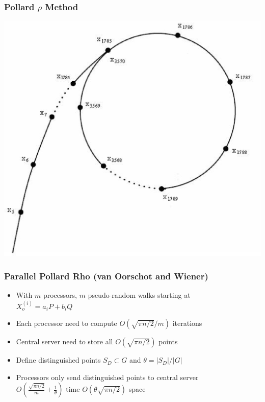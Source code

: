 \documentclass{beamer}
\begin{document}
  \begin{frame}
  	\frametitle{Pollard $\rho$ Method}
  	\includegraphics[scale=0.4]{rho.eps}
  \end{frame}
  
  \begin{frame}
  	\frametitle{Parallel Pollard Rho (van Oorschot and Wiener)}
  	\begin{itemize}
  		\item With $m$ processors, $m$ pseudo-random walks starting at\\
  		$X_o^{(i)} = a_iP + b_iQ$\\
  		\item Each processor need to compute $O(\sqrt{\pi n/2}/m)$ iterations\\
  		\item Central server need to store all $O(\sqrt{\pi n/2})$ points\\
  		\item Define distinguished points $S_D \subset G$ and $\theta = |S_D|/|G|$\\
  		\item Processors only send distinguished points to central server\\
  		$O(\frac{\sqrt{\pi n/2}}{m} + \frac{1}{\theta})$ time \qquad $O(\theta\sqrt{\pi n/2})$ space
  	\end{itemize}
  \end{frame} 
  
\end{document}
